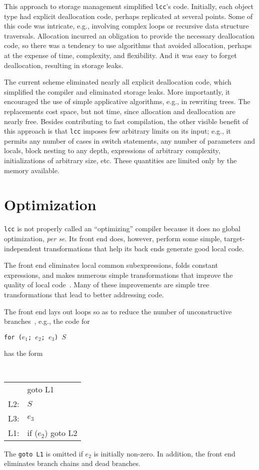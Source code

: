 This approach to storage management simplified \verb|lcc|'s code.
Initially, each object type had explicit deallocation code, perhaps
replicated at several points. Some of this code was intricate, e.g.,
involving complex loops or recursive data structure traversals.
Allocation incurred an obligation to provide the necessary
deallocation code, so there was a tendency to use
algorithms that avoided allocation,
perhaps at the expense of time, complexity, and flexibility.
And it was easy to forget deallocation, resulting in storage leaks.

The current scheme eliminated nearly all explicit deallocation code,
which simplified the compiler and eliminated storage leaks.
More importantly, it encouraged the use of simple applicative algorithms,
e.g., in rewriting trees.
The replacements cost space, but not time, since
allocation and deallocation are nearly free.
Besides contributing to fast compilation, the other visible
benefit of this approach is that \verb|lcc| imposes few
arbitrary limits on its input; e.g., it permits
any number of cases in switch statements,
any number of parameters and locals, block nesting to any depth,
expressions of arbitrary complexity, initializations of arbitrary size, etc.
These quantities are limited only by the memory available.


\section{Optimization}

\verb|lcc| is not properly called an ``optimizing'' compiler
because it does no global optimization, {\em per se}.
Its front end does, however, perform some simple, target-independent
transformations that help its back ends generate good local code.

The front end eliminates local common subexpressions,
folds constant expressions, and makes numerous simple
transformations that improve the quality of local code~\cite{hanson83}.
Many of these improvements are simple tree transformations
that lead to better addressing code.

The front end lays out loops so as to reduce the number
of unconstructive branches~\cite{baskett78}, e.g., the code for
\begin{flushleft}
\tt for ($e_1$; $e_2$; $e_3$) $S$
\end{flushleft}
has the form
\begin{flushleft}\tt
\begin{tabular}{ll}
	& goto L1 \\
L2:	& $S$ \\
L3:	& $e_3$ \\
L1:	& if ($e_2$) goto L2 \\
\end{tabular}
\end{flushleft}
The \verb|goto L1| is omitted if $e_2$ is initially non-zero.
In addition, the front end eliminates branch chains and dead branches.

